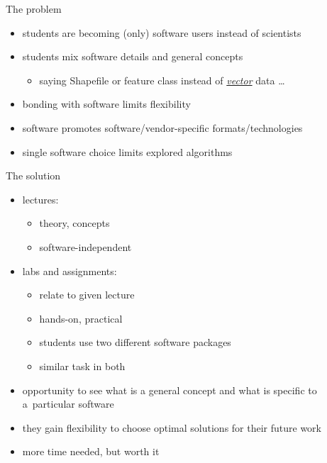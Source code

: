 \documentclass[xcolor={dvipsnames,usenames},beamer,aspectratio=169]{beamer}
\begin{document}
\begin{frame}{The problem}



\begin{itemize}
 \item students are becoming (only) software users instead of scientists
 \item students mix software details and general concepts
 \begin{itemize}
  \item saying Shapefile or feature class instead of
    \href{http://www.opengeospatial.org/ogc/glossary/v}{\emph{vector}} data%
    \ldots
\end{itemize}
 \item bonding with software limits flexibility
 \item software promotes software/vendor-specific formats/technologies
 \item single software choice limits explored algorithms

\end{itemize}

\end{frame}


\begin{frame}{The solution}

\begin{itemize}
 \item lectures:
 \begin{itemize}
  \item theory, concepts
  \item software-independent
 \end{itemize}
 \item labs and assignments:
 \begin{itemize}
  \item relate to given lecture
  \item hands-on, practical
  \item \alert<1>{students use two different software packages}
  \pause
  \item similar task in both
  \end{itemize}
\pause
\item opportunity to see what is a general concept
        and what is specific to a~particular software
\item they gain flexibility to choose optimal solutions for their future work
\item more time needed, but worth it
\end{itemize}

\end{frame}
\end{document}
